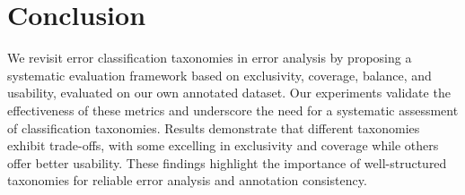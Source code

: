 \section{Conclusion}
We revisit error classification taxonomies in error analysis by proposing a systematic evaluation framework based on exclusivity, coverage, balance, and usability, evaluated on our own annotated dataset. Our experiments validate the effectiveness of these metrics and underscore the need for a systematic assessment of classification taxonomies. Results demonstrate that different taxonomies exhibit trade-offs, with some excelling in exclusivity and coverage while others offer better usability. These findings highlight the importance of well-structured taxonomies for reliable error analysis and annotation consistency.